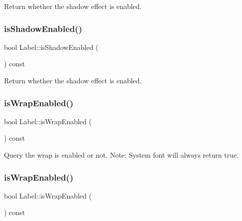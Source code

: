 Return whether the shadow effect is enabled. \mbox{\label{classLabel_ada5f28d2fbfcb18862890be2b36fd1d8}} 
\subsubsection{\texorpdfstring{is\+Shadow\+Enabled()}{isShadowEnabled()}\hspace{0.1cm}{\footnotesize\ttfamily [2/2]}}
{\footnotesize\ttfamily bool Label\+::is\+Shadow\+Enabled (\begin{DoxyParamCaption}{ }\end{DoxyParamCaption}) const\hspace{0.3cm}{\ttfamily [inline]}}

Return whether the shadow effect is enabled. \mbox{\label{classLabel_a1d6375fbdbcea18a4055f53520ea5dd1}} 
\subsubsection{\texorpdfstring{is\+Wrap\+Enabled()}{isWrapEnabled()}\hspace{0.1cm}{\footnotesize\ttfamily [1/2]}}
{\footnotesize\ttfamily bool Label\+::is\+Wrap\+Enabled (\begin{DoxyParamCaption}{ }\end{DoxyParamCaption}) const}

Query the wrap is enabled or not. Note\+: System font will always return true. \mbox{\label{classLabel_a1d6375fbdbcea18a4055f53520ea5dd1}} 
\subsubsection{\texorpdfstring{is\+Wrap\+Enabled()}{isWrapEnabled()}\hspace{0.1cm}{\footnotesize\ttfamily [2/2]}}
{\footnotesize\ttfamily bool Label\+::is\+Wrap\+Enabled (\begin{DoxyParamCaption}{ }\end{DoxyParamCaption}) const}

